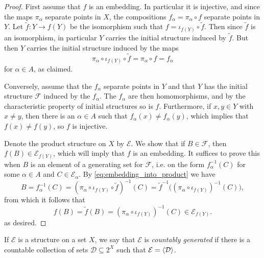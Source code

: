 \documentclass[article, a4paper, 11pt, oneside]{memoir}
\numberwithin{equation}{chapter}
\newcommand{\calE}{\mathcal{E}}
\newcommand{\calD}{\mathcal{D}}
\newcommand{\calF}{\mathcal{F}}
\DeclarePairedDelimiter{\gen}{\langle}{\rangle} %
\newcommand{\preim}{^{-1}}
\begin{document}
\begin{proof}
    First assume that $f$ is an embedding. In particular it is injective, and since the maps $\pi_\alpha$ separate points in $X$, the compositions $f_\alpha = \pi_\alpha \circ f$ separate points in $Y$. Let $\tilde f \colon Y \to f(Y)$ be the isomorphism such that $f = \iota_{f(Y)} \circ \tilde f$. Then since $\tilde f$ is an isomorphism, in particular $Y$ carries the initial structure induced by $\tilde f$. But then $Y$ carries the initial structure induced by the maps
    \begin{equation}
        \label{eq:embedding_into_product}
        \pi_\alpha \circ \iota_{f(Y)} \circ \tilde f
            = \pi_\alpha \circ f
            = f_\alpha
    \end{equation}
    for $\alpha \in A$, as claimed.

    Conversely, assume that the $f_\alpha$ separate points in $Y$ and that $Y$ has the initial structure $\calF$ induced by the $f_\alpha$. The $f_\alpha$ are then homomorphisms, and by the characteristic property of initial structures so is $f$. Furthermore, if $x,y \in Y$ with $x \neq y$, then there is an $\alpha \in A$ such that $f_\alpha(x) \neq f_\alpha(y)$, which implies that $f(x) \neq f(y)$, so $f$ is injective.

    Denote the product structure on $X$ by $\calE$. We show that if $B \in \calF$, then $f(B) \in \calE_{f(Y)}$, which will imply that $f$ is an embedding. It suffices to prove this when $B$ is an element of a generating set for $\calF$, i.e. on the form $f_\alpha\preim(C)$ for some $\alpha \in A$ and $C \in \calE_\alpha$. By \eqref{eq:embedding_into_product} we have
    \begin{equation*}
        B
            = f_\alpha\preim(C)
            = (\pi_\alpha \circ \iota_{f(Y)} \circ \tilde f)\preim(C)
            = \tilde f\preim \big( (\pi_\alpha \circ \iota_{f(Y)})\preim(C) \big),
    \end{equation*}
    from which it follows that
    \begin{equation*}
        f(B)
            = \tilde f(B)
            = (\pi_\alpha \circ \iota_{f(Y)})\preim(C)
            \in \calE_{f(Y)}.
    \end{equation*}
    as desired.
\end{proof}


If $\calE$ is a structure on a set $X$, we say that $\calE$ is \emph{countably generated} if there is a countable collection of sets $\calD \subseteq 2^X$ such that $\calE = \gen{\calD}$.
\end{document}
